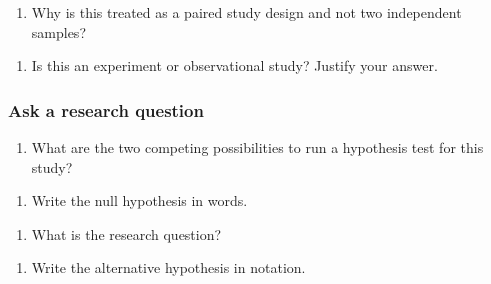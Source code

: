 \documentclass[
]{report}
\providecommand{\tightlist}{%
  \setlength{\itemsep}{0pt}\setlength{\parskip}{0pt}}
\begin{document}
\vspace{0.5in}

\begin{enumerate}
\def\labelenumi{\arabic{enumi}.}
\setcounter{enumi}{3}
\tightlist
\item
  Why is this treated as a paired study design and not two independent samples?
\end{enumerate}

\vspace{0.5in}

\begin{enumerate}
\def\labelenumi{\arabic{enumi}.}
\setcounter{enumi}{4}
\tightlist
\item
  Is this an experiment or observational study? Justify your answer.
\end{enumerate}

\vspace{0.5in}

\hypertarget{ask-a-research-question-2}{%
\subsubsection*{Ask a research question}\label{ask-a-research-question-2}}

\begin{enumerate}
\def\labelenumi{\arabic{enumi}.}
\setcounter{enumi}{5}
\tightlist
\item
  What are the two competing possibilities to run a hypothesis test for this study?
\end{enumerate}

\vspace{0.8in}

\begin{enumerate}
\def\labelenumi{\arabic{enumi}.}
\setcounter{enumi}{6}
\tightlist
\item
  Write the null hypothesis in words.
\end{enumerate}

\vspace{0.8in}

\begin{enumerate}
\def\labelenumi{\arabic{enumi}.}
\setcounter{enumi}{7}
\tightlist
\item
  What is the research question?
\end{enumerate}

\vspace{0.8in}

\begin{enumerate}
\def\labelenumi{\arabic{enumi}.}
\setcounter{enumi}{8}
\tightlist
\item
  Write the alternative hypothesis in notation.
\end{enumerate}
\end{document}
